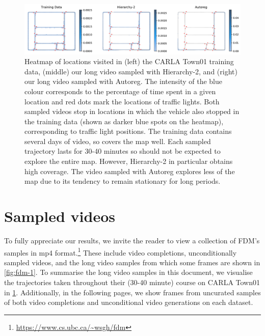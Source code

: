 \begin{figure}
    \centering
    \includegraphics[width=\textwidth]{figs/fdm/heatmap.pdf}
    \caption{Heatmap of locations visited in (left) the CARLA Town01 training data, (middle) our long video sampled with Hierarchy-2, and (right) our long video sampled with Autoreg. The intensity of the blue colour corresponds to the percentage of time spent in a given location and red dots mark the locations of traffic lights. Both sampled videos stop in locations in which the vehicle also stopped in the training data (shown as darker blue spots on the heatmap), corresponding to traffic light positions. The training data contains several days of video, so covers the map well. Each sampled trajectory lasts for 30-40 minutes so should not be expected to explore the entire map. However, Hierarchy-2 in particular obtains high coverage. The video sampled with Autoreg explores less of the map due to its tendency to remain stationary for long periods.  }
    \label{fig:fdm-carla-long-video-heatmap}
\end{figure}



\section{Sampled videos}
To fully appreciate our results, we invite the reader to view a collection of FDM's samples in mp4 format.\footnote{\url{https://www.cs.ubc.ca/~wsgh/fdm}} These include video completions, unconditionally sampled videos, and the long video samples from which some frames are shown in \cref{fig:fdm-1}. To summarise the long video samples in this document, we visualise the trajectories taken throughout their (30-40 minute) course on CARLA Town01 in \cref{fig:fdm-carla-long-video-heatmap}.
Additionally, in the following pages, we show frames from uncurated samples of both video completions and unconditional video generations on each dataset.


